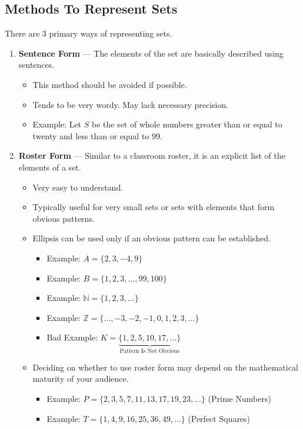 \subsection{Methods To Represent Sets}

There are 3 primary ways of representing sets.

\begin{enumerate}
  \item \textbf{Sentence Form} --- The elements of the set are basically described using sentences.
	\begin{itemize}
	  \item This method should be avoided if possible.
	  \item Tends to be very wordy. May lack necessary precision.
	  \item Example: Let $S$ be the set of whole numbers greater than or equal to twenty and less than or equal to 99.
	\end{itemize}

  \item \textbf{Roster Form} --- Similar to a classroom roster, it is an explicit list of the elements of a set.
	\begin{itemize}
	  \item Very easy to understand.
	  \item Typically useful for very small sets or sets with elements that form obvious patterns.
	  \item Ellipsis can be used only if an obvious pattern can be established.
		\begin{itemize}
		  \item Example: $A = \{2,3,-4,9\}$
		  \item Example: $B = \{1,2,3,\ldots,99,100\}$
		  \item Example: $\mathbb{N} = \{1,2,3,\ldots\}$
		  \item Example: $\mathbb{Z} = \{\ldots,-3,-2,-1,0,1,2,3,\ldots\}$
		  \item Bad Example: $K = \underbrace{\{1,2,5,10,17,\ldots\}}_{\text{Pattern Is Not Obvious}}$
		\end{itemize}
	  \item Deciding on whether to use roster form may depend on the mathematical maturity of your audience.
		\begin{itemize}
		  \item Example: $P = \{2,3,5,7,11,13,17,19,23,\ldots\}$ (Prime Numbers)
		  \item Example: $T = \{1,4,9,16,25,36,49,\ldots\}$ (Perfect Squares)
		\end{itemize}
	\end{itemize}


\end{enumerate}
